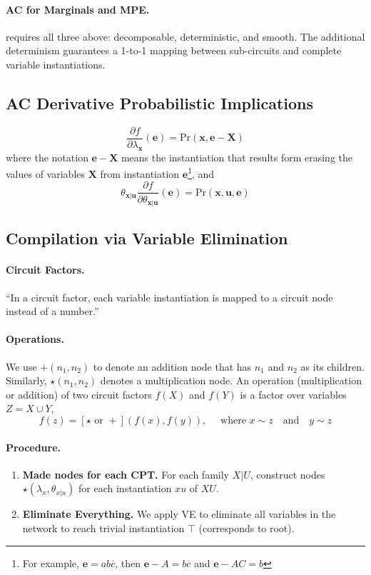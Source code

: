 \documentclass[11pt]{article}
\newcommand{\be}{\mathbf{e}}
\newcommand{\bu}{\mathbf{u}}
\newcommand{\bx}{\mathbf{x}}
\newcommand{\pr}{\mathrm{Pr}}
\begin{document}
\paragraph{AC for Marginals and MPE.} requires all three above: decomposable, deterministic, and smooth. The additional determinism guarantees a 1-to-1 mapping between sub-circuits and complete variable instantiations. 

\subsection{AC Derivative Probabilistic Implications}
\begin{equation}
	\frac{\partial f}{\partial \lambda _\bx} (\be) = \pr( \bx, \be - \mathbf X) 
\end{equation}
where the notation $\be - \mathbf X$ means the instantiation that results form erasing the values of variables $\mathbf X$ from instantiation $\be$\footnote{For example, $\mathbf e = ab \overbar c$, then $\be - A = b\overbar c$ and $\be - AC = b$}, and 
\begin{equation}
	\theta_{\bx | \bu} \frac{\partial f}{\partial \theta_{\bx | \bu}} ( \be) = \pr (\bx, \bu, \be)
\end{equation}

\subsection{Compilation via Variable Elimination}
\paragraph{Circuit Factors.}
``In a circuit factor, each variable instantiation is mapped to a circuit node instead of a number.''

\paragraph{Operations.}
We use $+(n_1, n_2)$ to denote an addition node that has $n_1$ and $n_2$ as its children. Similarly, $\star (n_1, n_2)$ denotes a multiplication node. An operation (multiplication or addition) of two circuit factors $f(X)$ and $f(Y)$ is a factor over variables $Z = X \cup Y$, 
\begin{equation}
	f(z) = [\star \text{ or } +]( f(x), f(y)), \quad \text{ where } x \sim z \quad \text{and} \quad y \sim z 
\end{equation}

\paragraph{Procedure.}
\begin{enumerate}
	\item \textbf{Made nodes for each CPT.} For each family $X|U$, construct nodes $\star (\lambda_x, \theta_{x | u} )$ for each instantiation $xu$ of $XU$. 
	\item \textbf{Eliminate Everything.} We apply VE to eliminate all variables in the network to reach trivial instantiation $\top$ (corresponds to root). 
\end{enumerate}
\end{document}
